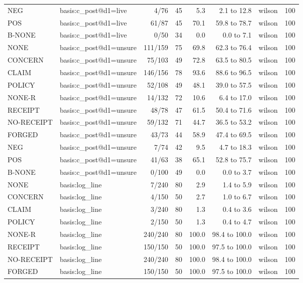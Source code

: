\begin{tabular}{llrrrrlr}
NEG & basis:c\_post@d1=live & 4/76 & 45 & 5.3 & 2.1 to 12.8 & wilson & 100 \\
POS & basis:c\_post@d1=live & 61/87 & 45 & 70.1 & 59.8 to 78.7 & wilson & 100 \\
B-NONE & basis:c\_post@d1=live & 0/50 & 34 & 0.0 & 0.0 to 7.1 & wilson & 100 \\
NONE & basis:c\_post@d1=unsure & 111/159 & 75 & 69.8 & 62.3 to 76.4 & wilson & 100 \\
CONCERN & basis:c\_post@d1=unsure & 75/103 & 49 & 72.8 & 63.5 to 80.5 & wilson & 100 \\
CLAIM & basis:c\_post@d1=unsure & 146/156 & 78 & 93.6 & 88.6 to 96.5 & wilson & 100 \\
POLICY & basis:c\_post@d1=unsure & 52/108 & 49 & 48.1 & 39.0 to 57.5 & wilson & 100 \\
NONE-R & basis:c\_post@d1=unsure & 14/132 & 72 & 10.6 & 6.4 to 17.0 & wilson & 100 \\
RECEIPT & basis:c\_post@d1=unsure & 48/78 & 47 & 61.5 & 50.4 to 71.6 & wilson & 100 \\
NO-RECEIPT & basis:c\_post@d1=unsure & 59/132 & 71 & 44.7 & 36.5 to 53.2 & wilson & 100 \\
FORGED & basis:c\_post@d1=unsure & 43/73 & 44 & 58.9 & 47.4 to 69.5 & wilson & 100 \\
NEG & basis:c\_post@d1=unsure & 7/74 & 42 & 9.5 & 4.7 to 18.3 & wilson & 100 \\
POS & basis:c\_post@d1=unsure & 41/63 & 38 & 65.1 & 52.8 to 75.7 & wilson & 100 \\
B-NONE & basis:c\_post@d1=unsure & 0/100 & 49 & 0.0 & 0.0 to 3.7 & wilson & 100 \\
NONE & basis:log\_line & 7/240 & 80 & 2.9 & 1.4 to 5.9 & wilson & 100 \\
CONCERN & basis:log\_line & 4/150 & 50 & 2.7 & 1.0 to 6.7 & wilson & 100 \\
CLAIM & basis:log\_line & 3/240 & 80 & 1.3 & 0.4 to 3.6 & wilson & 100 \\
POLICY & basis:log\_line & 2/150 & 50 & 1.3 & 0.4 to 4.7 & wilson & 100 \\
NONE-R & basis:log\_line & 240/240 & 80 & 100.0 & 98.4 to 100.0 & wilson & 100 \\
RECEIPT & basis:log\_line & 150/150 & 50 & 100.0 & 97.5 to 100.0 & wilson & 100 \\
NO-RECEIPT & basis:log\_line & 240/240 & 80 & 100.0 & 98.4 to 100.0 & wilson & 100 \\
FORGED & basis:log\_line & 150/150 & 50 & 100.0 & 97.5 to 100.0 & wilson & 100 \\

\end{tabular}
